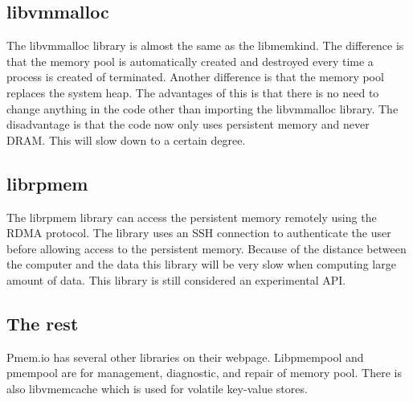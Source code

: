 \documentclass[12pt,a4paper,UKenglish]{article}
\begin{document}
\subsection{libvmmalloc}
The libvmmalloc\cite{libvmmalloc} library is almost the same as the libmemkind. The difference is that the memory pool is automatically created and destroyed every time a process is created of terminated. Another difference is that the memory pool replaces the system heap. The advantages of this is that there is no need to change anything in the code other than importing the libvmmalloc library. The disadvantage is that the code now only uses persistent memory and never DRAM. This will slow down to a certain degree. 

\subsection{librpmem}
The librpmem\cite{librpmem} library can access the persistent memory remotely using the RDMA protocol. The library uses an SSH connection to authenticate the user before allowing access to the persistent memory. Because of the distance between the computer and the data this library will be very slow when computing large amount of data. This library is still considered an experimental API.

\subsection{The rest}
Pmem.io has several other libraries on their webpage. Libpmempool and pmempool are for management, diagnostic, and repair of memory pool. There is also libvmemcache which is used for volatile key-value stores.
\end{document}
